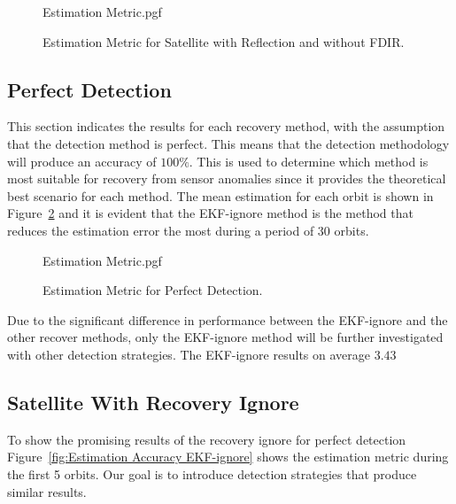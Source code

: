 \documentclass[letterpaper, 10 pt, conference]{ieeeconf}  %
\begin{document}
\begin{figure}[!htb]
	\begin{center}
	{Estimation Metric.pgf}
	\end{center}
	\caption[Estimation Metric for Satellite with Reflection and without FDIR]{Estimation Metric for Satellite with Reflection and without FDIR.}
	\label{fig:Estimation Accuracy Reflection}
\end{figure}

\subsection{Perfect Detection}
This section indicates the results for each recovery method, with the assumption that the detection method is perfect. This means that the detection methodology will produce an accuracy of $100\%$. This is used to determine which method is most suitable for recovery from sensor anomalies since it provides the theoretical best scenario for each method. The mean estimation for each orbit is shown in Figure~\ref{fig:Estimation Metric Summary} and it is evident that the EKF-ignore method is the method that reduces the estimation error the most during a period of $30$ orbits. 

\begin{figure}[!htb]
	\begin{center}
		{Estimation Metric.pgf}
	\end{center}
	\caption[Estimation Metric for Perfect Detection]{Estimation Metric for Perfect Detection.}
	\label{fig:Estimation Metric Summary}
\end{figure}

Due to the significant difference in performance between the EKF-ignore and the other recover methods, only the EKF-ignore method will be further investigated with other detection strategies. The EKF-ignore results on average $3.43$

\subsection{Satellite With Recovery Ignore}
To show the promising results of the recovery ignore for perfect detection Figure~\ref{fig:Estimation Accuracy EKF-ignore} shows the estimation metric during the first 5 orbits. Our goal is to introduce detection strategies that produce similar results.
\end{document}
